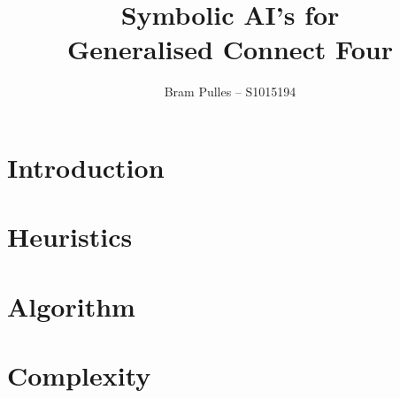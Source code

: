 \documentclass[a4paper]{article}
\author{Bram Pulles -- S1015194}
\title{\textbf{Symbolic AI's for\\ Generalised Connect Four}}
\begin{document}
\maketitle

\tableofcontents

\pagebreak
\section{Introduction}

\section{Heuristics}

\section{Algorithm}

\section{Complexity}
\end{document}

